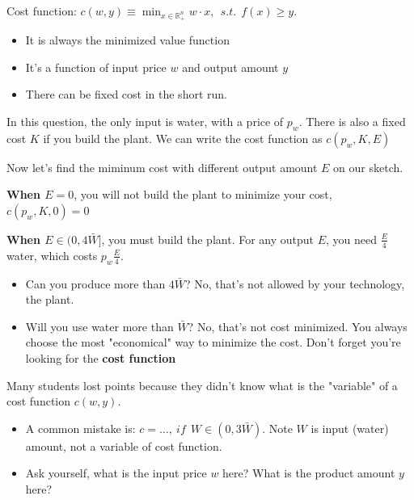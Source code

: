 \documentclass{article}
\newcommand{\R}{\mathbb{R}}
\begin{document}
\begin{mdframed}[backgroundcolor=blue!20,linecolor=white]
Cost function: $c(w,y) \equiv \min_{x \in \R^n_+} w \cdot x , \ \ s.t. \ \ f(x) \ge y.$

\begin{itemize}
\item It is always the minimized value function
\item It's a function of input price $w$ and output amount $y$
\item There can be fixed cost in the short run.
\end{itemize}

In this question, the only input is water, with a price of $p_w$. There is also a fixed cost $K$ if you
build the plant. We can write the cost function as $c(p_w,K,E)$

\vspace{3mm}

Now let's find the miminum cost with different output amount $E$ on our sketch.

\vspace{3mm}

\textbf{When $E=0$}, you will not build the plant to minimize your cost, $c(p_w,K,0) = 0$

\vspace{3mm}

\textbf{When $E \in (0,4\bar{W}]$}, you must build the plant. For any output $E$, you need  $\frac{E}{4}$ water,
which costs $p_w\frac{E}{4}$.

\begin{itemize}
\item Can you produce more than $4\bar{W}$? No, that's not allowed by your technology, the plant.
\item Will you use water more than $\bar{W}$? No, that's not cost minimized. You always choose the most
"economical" way to minimize the cost. Don't forget you're looking for the \textbf{cost function}
\end{itemize}

\end{mdframed}

\begin{mdframed}[backgroundcolor=yellow!20,linecolor=white]
Many students lost points because they didn't know what is the "variable" of a cost function $c(w,y)$.

\begin{itemize}
\item A common mistake is: $c = \dots , \ if \ \ W \in (0,3\bar{W})$. Note $W$ is input (water) amount, not a variable of cost function.
\item Ask yourself, what is the input price $w$ here? What is the product amount $y$ here?

\end{itemize}


\end{mdframed}
\end{document}
